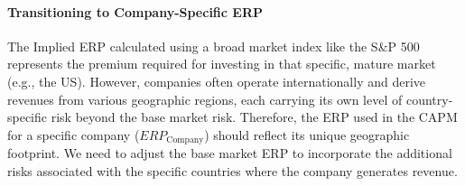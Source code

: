 \paragraph{Transitioning to Company-Specific ERP}
The Implied ERP calculated using a broad market index like the S\&P 500 represents the premium required for investing in that specific, mature market (e.g., the US). However, companies often operate internationally and derive revenues from various geographic regions, each carrying its own level of country-specific risk beyond the base market risk. Therefore, the ERP used in the CAPM for a specific company (\(ERP_{\text{Company}}\)) should reflect its unique geographic footprint.
We need to adjust the base market ERP to incorporate the additional risks associated with the specific countries where the company generates revenue.


